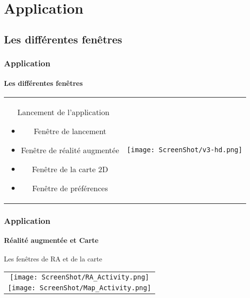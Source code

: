 \section{Application}
\subsection{Les différentes fenêtres}

\begin{frame}
\frametitle{Application}
\framesubtitle{Les différentes fenêtres}

\begin{tabular}{cc}
	\begin{minipage}{6cm}
		Lancement de l'application
		\begin{itemize}
			\item Fenêtre de lancement
			\item Fenêtre de réalité augmentée
			\item Fenêtre de la carte 2D
			\item Fenêtre de préférences
		\end{itemize}
	\end{minipage} &
	\begin{minipage}{6cm}
		\texttt{[image: ScreenShot/v3-hd.png]} 
	\end{minipage}\\
\end{tabular}
\end{frame}

\begin{frame}
\frametitle{Application}
\framesubtitle{Réalité augmentée et Carte}
Les fenêtres de RA et de la carte 
\begin{center}
	\begin{tabular}{c}
		\texttt{[image: ScreenShot/RA\_Activity.png]} \\
		\texttt{[image: ScreenShot/Map\_Activity.png]}
	\end{tabular}
\end{center}
\end{frame}


